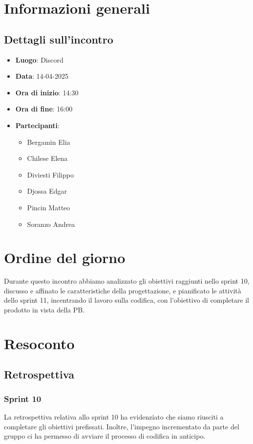 \section{Informazioni generali}
\subsection{Dettagli sull'incontro}
\begin{itemize}
    \item \textbf{Luogo}: Discord
    \item \textbf{Data}: 14-04-2025
    \item \textbf{Ora di inizio}: 14:30
    \item \textbf{Ora di fine}: 16:00
    \item \textbf{Partecipanti}:
    \begin{itemize}
        \item Bergamin Elia
        \item Chilese Elena
        \item Diviesti Filippo
        \item Djossa Edgar
        \item Pincin Matteo 
        \item Soranzo Andrea  
    \end{itemize}
\end{itemize}

\section{Ordine del giorno}
Durante questo incontro abbiamo analizzato gli obiettivi raggiunti nello sprint 10, discusso e affinato le caratteristiche della progettazione, e pianificato le attività dello sprint 11, incentrando il lavoro sulla codifica, con l'obiettivo di completare il prodotto in vista della PB.

\section{Resoconto}
\subsection{Retrospettiva}
\subsubsection{Sprint 10}
La retrospettiva relativa allo sprint 10 ha evidenziato che siamo riusciti a completare gli obiettivi prefissati.
Inoltre, l’impegno incrementato da parte del gruppo ci ha permesso di avviare il processo di codifica in anticipo.

